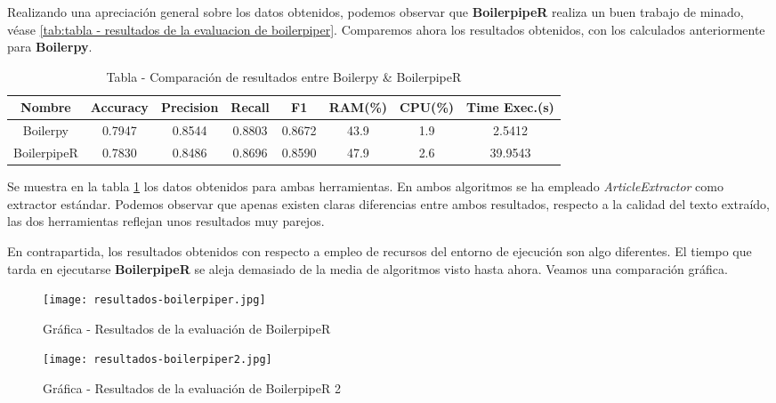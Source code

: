 Realizando una apreciación general sobre los datos obtenidos, podemos observar que \textbf{BoilerpipeR}
realiza un buen trabajo de minado, véase \ref{tab:tabla - resultados de la evaluacion de boilerpiper}.
Comparemos ahora los resultados obtenidos, con los calculados anteriormente para \textbf{Boilerpy}.

\begin{table}[h]
    \begin{center}
      \begin{tabular}{| c | c | c | c | c | c | c | c |} \hline 
       \textbf{Nombre} & \textbf{Accuracy} & \textbf{Precision}  & \textbf{Recall} & \textbf{F1} & \textbf{RAM(\%)} & \textbf{CPU(\%)} & \textbf{Time Exec.(s)} \\ \hline
       Boilerpy & 0.7947 & 0.8544 & 0.8803 & 0.8672 & 43.9 & 1.9 & 2.5412 \\ \hline
       BoilerpipeR & 0.7830 & 0.8486 & 0.8696 & 0.8590 & 47.9 & 2.6 & 39.9543 \\ \hline
      \end{tabular}
      \caption{Tabla - Comparación de resultados entre Boilerpy \& BoilerpipeR}
      \label{tab:tabla - comparacion de resultados entre boilerpy y boilerpiper}
    \end{center}
\end{table}

Se muestra en la tabla \ref{tab:tabla - comparacion de resultados entre boilerpy y boilerpiper} los datos
obtenidos para ambas herramientas. En ambos algoritmos se ha empleado \emph{ArticleExtractor} como extractor
estándar. Podemos observar que apenas existen claras diferencias entre ambos resultados, respecto a la
calidad del texto extraído, las dos herramientas reflejan unos resultados muy parejos.

En contrapartida, los resultados obtenidos con respecto a empleo de recursos del entorno de ejecución son
algo diferentes. El tiempo que tarda en ejecutarse \textbf{BoilerpipeR} se aleja demasiado de la media de
algoritmos visto hasta ahora. Veamos una comparación gráfica.

\begin{figure}[tphb]
    \centering
    \texttt{[image: resultados-boilerpiper.jpg]}
    \caption{Gráfica - Resultados de la evaluación de BoilerpipeR}
    \label{img:grafica - resultados de la evaluacion de boilerpiper}
\end{figure}

\begin{figure}[tphb]
    \centering
    \texttt{[image: resultados-boilerpiper2.jpg]}
    \caption{Gráfica - Resultados de la evaluación de BoilerpipeR 2}
    \label{img:grafica - resultados de la evaluacion de boilerpiper 2}
\end{figure}

